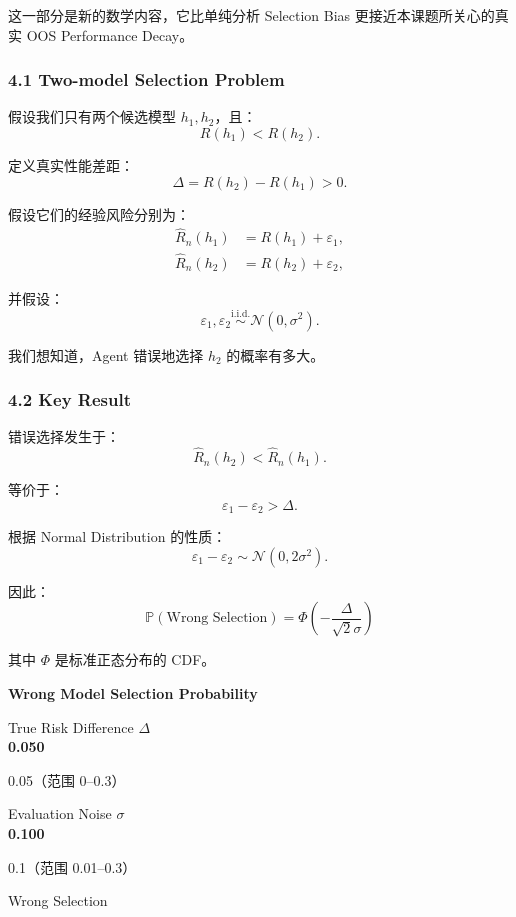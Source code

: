 这一部分是新的数学内容，它比单纯分析 Selection Bias 更接近本课题所关心的真实 OOS Performance Decay。

\hypertarget{part-2-16-0001-two-model-selection-problem}{%
\subsubsection{4.1 Two-model Selection Problem}\label{part-2-16-0001-two-model-selection-problem}}

假设我们只有两个候选模型 \(h_1,h_2\)，且：
\[R(h_1)<R(h_2).\]

定义真实性能差距：
\[\Delta=R(h_2)-R(h_1)>0.\]

假设它们的经验风险分别为：
\[\begin{aligned}
\widehat R_n(h_1)&=R(h_1)+\varepsilon_1,\\
\widehat R_n(h_2)&=R(h_2)+\varepsilon_2,
\end{aligned}\]

并假设：
\[\varepsilon_1,\varepsilon_2
\overset{\mathrm{i.i.d.}}{\sim}
\mathcal N(0,\sigma^2).\]

我们想知道，Agent 错误地选择 \(h_2\) 的概率有多大。

\hypertarget{part-2-16-0001-key-result}{%
\subsubsection{4.2 Key Result}\label{part-2-16-0001-key-result}}

错误选择发生于：
\[\widehat R_n(h_2)<\widehat R_n(h_1).\]

等价于：
\[\varepsilon_1-\varepsilon_2>\Delta.\]

根据 Normal Distribution 的性质：
\[\varepsilon_1-\varepsilon_2
\sim\mathcal N(0,2\sigma^2).\]

因此：
\[\boxed{
\mathbb P(\text{Wrong Selection})
=
\Phi\left(-\frac{\Delta}{\sqrt2\sigma}\right)
}\]

其中 \(\Phi\) 是标准正态分布的 CDF。

\textbf{Wrong Model Selection Probability}

True Risk Difference \(\Delta\)\\
\textbf{0.050}

0.05（范围 0--0.3）

Evaluation Noise \(\sigma\)\\
\textbf{0.100}

0.1（范围 0.01--0.3）

Wrong Selection

